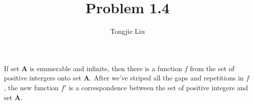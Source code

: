 \documentclass{article}
\title{Problem 1.4}
\author{Tongjie Liu}
\begin{document}
\maketitle


If set $\mathbf{A}$ is enumerable and infinite, then there is a function
$f$ from the set of positive intergers onto set $\mathbf{A}$. After we've
striped all the gaps and repetitions in $f$, the new function $f'$ is a
correspondence between the set of positive integers and set $\mathbf{A}$.
\end{document}
